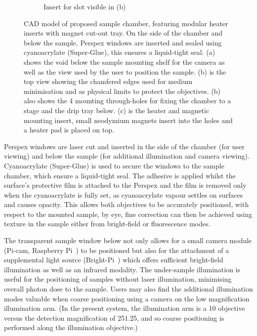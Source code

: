 \begin{figure}
\begin{subfigure}[b]{0.3\linewidth}
         \caption{Insert for slot visible in (b)}\label{fig:chamber_slide}
    \end{subfigure}
    \caption[\gls{CAD} model of proposed sample chamber]{\gls{CAD} model of proposed sample chamber, featuring modular heater inserts with magnet cut-out tray.
    On the side of the chamber and below the sample, Perspex windows are inserted and sealed using cyanoacrylate (Super-Glue), this ensures a liquid-tight seal.
    (a) shows the void below the sample mounting shelf for the camera as well as the view used by the user to position the sample.
    (b) is the top view showing the chamfered edges used for medium minimisation and as physical limits to protect the objectives.
    (b) also shows the 4 mounting through-holes for fixing the chamber to a stage and the drip tray below.
    (c) is the heater and magnetic mounting insert, small neodymium magnets insert into the holes and a heater pad is placed on top.
    }
\end{figure}

Perspex windows are laser cut and inserted in the side of the chamber (for user viewing) and below the sample (for additional illumination and camera viewing).
Cyanoacrylate (Super-Glue) is used to secure the windows to the sample chamber, which ensure a liquid-tight seal.
The adhesive is applied whilst the surface's protective film is attached to the Perspex and the film is removed only when the cyanoacrylate is fully set, as cyanoacrylate vapour settles on surfaces and causes opacity.
This allows both objectives to be accurately positioned, with respect to the mounted sample, by eye, fine correction can then be achieved using texture in the sample either from bright-field or fluorescence modes.

The transparent sample window below not only allows for a small camera module (Pi-cam, Raspberry Pi~\cite{BrightPiBright}) to be positioned
but also for the attachment of a supplemental light source (Bright-Pi~\cite{CameraModuleV2}) which offers sufficient bright-field illumination as well as an infrared modality.
The under-sample illumination is useful for the positioning of samples without laser illumination, minimising overall photon dose to the sample.
Users may also find the additional illumination modes valuable when coarse positioning using a camera on the low magnification illumination arm.
(In the present system, the illumination arm is a \SI{10}{\times} objective versus the detection magnification of \SI{25}{\times}\SI{1.25}{\times}, and so coarse positioning is performed along the illumination objective.)

